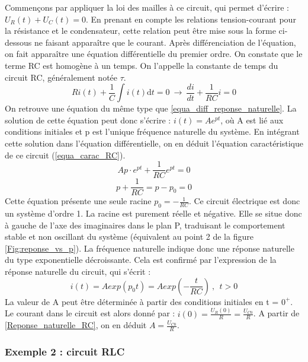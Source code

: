 \documentclass[]{report}
\newcommand{\deriv}{\mathrm{d}}
\begin{document}
	\vspace{1\baselineskip}
	Commençons par appliquer la loi des mailles à ce circuit, qui permet d'écrire : $U_{R}(t)+U_{C}(t)=0.$ En prenant en compte les relations tension-courant pour la résistance et le condensateur, cette relation peut être mise sous la forme ci-dessous ne faisant apparaître que le courant. Après différenciation de l'équation, on fait apparaître une équation différentielle du premier ordre. On constate que le terme RC est homogène à un temps. On l'appelle la constante de temps du circuit RC, généralement notée $\tau$.
	\begin{equation*}
	Ri(t)+\frac{1}{C}\int i(t) \deriv t=0~\rightarrow ~\frac{di}{dt}+\frac{1}{RC}i = 0
	\end{equation*}
	On retrouve une équation du même type que \ref{equa_diff_reponse_naturelle}. La solution de cette équation peut donc s'écrire : $i(t) = Ae^{pt}$, où A est lié aux conditions initiales et p est l'unique fréquence naturelle du système. En intégrant cette solution dans l'équation différentielle, on en déduit l'équation caractéristique de ce circuit (\ref{equa_carac_RC}).
	\begin{equation*}
	Ap\cdot e^{pt}+\frac{1}{RC} e^{pt}=0
	\end{equation*}
	\begin{equation}\label{equa_carac_RC}
	p+\frac{1}{RC}=p-p_{0}=0
	\end{equation}
	Cette équation présente une seule racine $p_{0} = -\frac{1}{RC}$. Ce circuit électrique est donc un système d'ordre 1. La racine est purement réelle et négative. Elle se situe donc à gauche de l'axe des imaginaires dans le plan P, traduisant le comportement stable et non oscillant du système (équivalent au point 2 de la figure \ref{Fig:reponse_vs_p}). La fréquence naturelle	indique donc une réponse naturelle du type exponentielle décroissante. Cela est confirmé par l'expression de la réponse naturelle du circuit, qui s'écrit :
	\begin{equation}\label{Reponse_naturelle_RC}
	i(t)=Aexp(p_{0}t)=Aexp(-\frac{t}{RC})~,~~t>0
	\end{equation}
	La valeur de A peut être déterminée à partir des conditions initiales en t = $0^{+}$. Le courant dans le circuit est alors donné par : $i(0)=\frac{U_{R}(0)}{R}=\frac{U_{C0}}{R}$. A partir de \ref{Reponse_naturelle_RC}, on en déduit $A=\frac{U_{C0}}{R}$.


	\subsubsection{Exemple 2 : circuit RLC}
	
\end{document}
